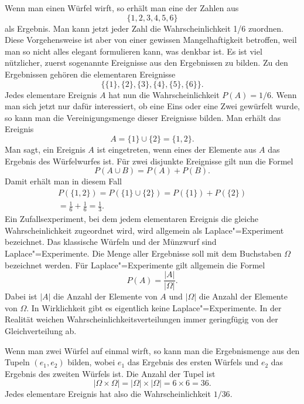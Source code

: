 \documentclass[a4paper,11pt,fleqn,twocolumn,twoside]{scrartcl}
\numberwithin{equation}{section}
\begin{document}
Wenn man einen Würfel wirft, so erhält man eine der Zahlen aus
\begin{equation}
\{1,2,3,4,5,6\}
\end{equation}
als Ergebnis. Man kann jetzt jeder Zahl die Wahrscheinlichkeit 1/6
zuordnen. Diese Vorgehensweise ist aber von einer gewissen
Mangelhaftigkeit betroffen, weil man so nicht alles elegant
formulieren kann, was denkbar ist. Es ist viel nützlicher, zuerst
sogenannte Ereignisse aus den Ergebnissen zu bilden. Zu den
Ergebnissen gehören die elementaren Ereignisse
\begin{equation}
\{\{1\},\{2\},\{3\},\{4\},\{5\},\{6\}\}.
\end{equation}
Jedes elementare Ereignis $A$ hat nun die Wahrscheinlichkeit
$P(A)=1/6$. Wenn man sich jetzt nur dafür interessiert, ob eine
Eins oder eine Zwei gewürfelt wurde, so kann man die Vereinigungsmenge
dieser Ereignisse bilden. Man erhält das Ereignis
\begin{equation}
A = \{1\}\cup\{2\} = \{1,2\}.
\end{equation}
Man sagt, ein Ereignis $A$ ist eingetreten, wenn eines der Elemente
aus $A$ das Ergebnis des Würfelwurfes ist. Für zwei disjunkte
Ereignisse gilt nun die Formel
\begin{equation}
P(A\cup B) = P(A)+P(B).
\end{equation}
Damit erhält man in diesem Fall
\begin{gather*}
P(\{1,2\})=P(\{1\}\cup\{2\})=P(\{1\})+P(\{2\})\\
= \frac{1}{6}+\frac{1}{6} = \frac{1}{3}.
\end{gather*}
Ein Zufallsexperiment, bei dem jedem elementaren Ereignis die
gleiche Wahrscheinlichkeit zugeordnet wird, wird allgemein als
Laplace"=Experiment bezeichnet. Das klassische Würfeln und der
Münzwurf sind Laplace"=Experimente. Die Menge aller Ergebnisse
soll mit dem Buchstaben $\Omega$ bezeichnet werden.
Für Laplace"=Experimente gilt allgemein die Formel
\begin{equation}
P(A) = \frac{|A|}{|\Omega|}.
\end{equation}
Dabei ist $|A|$ die Anzahl der Elemente von $A$ und $|\Omega|$
die Anzahl der Elemente von $\Omega$. In Wirklichkeit gibt es
eigentlich keine Laplace"=Experimente. In der Realität weichen
Wahrscheinlichkeitsverteilungen immer geringfügig von der
Gleichverteilung ab.

Wenn man zwei Würfel auf einmal wirft, so kann man die Ergebnismenge
aus den Tupeln $(e_1,e_2)$ bilden, wobei $e_1$ das Ergebnis des
ersten Würfels und $e_2$ das Ergebnis des zweiten Würfels ist.
Die Anzahl der Tupel ist
\begin{equation}
|\Omega\times\Omega| = |\Omega|\times|\Omega| = 6\times 6 = 36.
\end{equation}
Jedes elementare Ereignis hat also die Wahrscheinlichkeit $1/36$.
\end{document}
